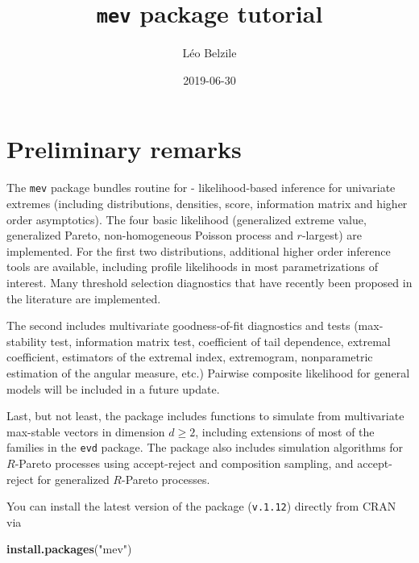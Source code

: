 \documentclass[]{book}
\title{\texttt{mev} package tutorial}
\author{Léo Belzile}
\date{2019-06-30}
\newenvironment{Shaded}{\begin{snugshade}}{\end{snugshade}}
\newcommand{\KeywordTok}[1]{\textcolor[rgb]{0.13,0.29,0.53}{\textbf{#1}}}
\newcommand{\NormalTok}[1]{#1}
\newcommand{\StringTok}[1]{\textcolor[rgb]{0.31,0.60,0.02}{#1}}
\begin{document}
\maketitle

{
\setcounter{tocdepth}{1}
\tableofcontents
}
\hypertarget{preliminary-remarks}{%
\chapter*{Preliminary remarks}\label{preliminary-remarks}}

The \texttt{mev} package bundles routine for
- likelihood-based inference for univariate extremes (including distributions, densities, score, information matrix and higher order asymptotics). The four basic likelihood (generalized extreme value, generalized Pareto, non-homogeneous Poisson process and \(r\)-largest) are implemented. For the first two distributions, additional higher order inference tools are available, including profile likelihoods in most parametrizations of interest. Many threshold selection diagnostics that have recently been proposed in the literature are implemented.

The second includes multivariate goodness-of-fit diagnostics and tests (max-stability test, information matrix test, coefficient of tail dependence, extremal coefficient, estimators of the extremal index, extremogram, nonparametric estimation of the angular measure, etc.) Pairwise composite likelihood for general models will be included in a future update.

Last, but not least, the package includes functions to simulate from multivariate max-stable vectors in dimension \(d\geq 2\), including extensions of most of the families in the \texttt{evd} package. The package also includes simulation algorithms for \(R\)-Pareto processes using accept-reject and composition sampling, and accept-reject for generalized \(R\)-Pareto processes.

You can install the latest version of the package (\texttt{v.1.12}) directly from CRAN via

\begin{Shaded}
\begin{Highlighting}[]
\KeywordTok{install.packages}\NormalTok{(}\StringTok{"mev"}\NormalTok{)}
\end{Highlighting}
\end{Shaded}
\end{document}
